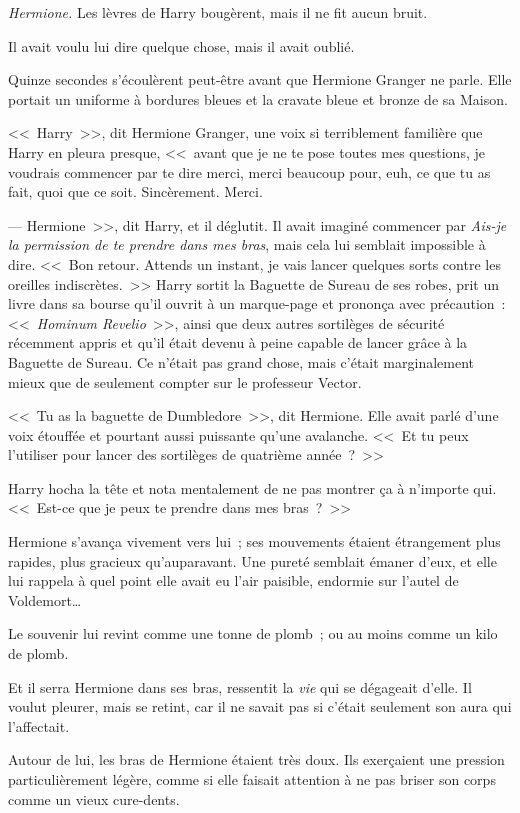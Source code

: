 \emph{Hermione.} Les lèvres de Harry bougèrent, mais il ne fit aucun bruit.

Il avait voulu lui dire quelque chose, mais il avait oublié.

Quinze secondes s'écoulèrent peut-être avant que Hermione Granger ne parle. Elle portait un uniforme à bordures bleues et la cravate bleue et bronze de sa Maison.

<<~Harry~>>, dit Hermione Granger, une voix si terriblement familière que Harry en pleura presque, <<~avant que je ne te pose toutes mes questions, je voudrais commencer par te dire merci, merci beaucoup pour, euh, ce que tu as fait, quoi que ce soit. Sincèrement. Merci.

--- Hermione~>>, dit Harry, et il déglutit. Il avait imaginé commencer par \emph{Ais-je la permission de te prendre dans mes bras}, mais cela lui semblait impossible à dire. <<~Bon retour. Attends un instant, je vais lancer quelques sorts contre les oreilles indiscrètes.~>> Harry sortit la Baguette de Sureau de ses robes, prit un livre dans sa bourse qu'il ouvrit à un marque-page et prononça avec précaution~: <<~\emph{Hominum Revelio}~>>, ainsi que deux autres sortilèges de sécurité récemment appris et qu'il était devenu à peine capable de lancer grâce à la Baguette de Sureau. Ce n'était pas grand chose, mais c'était marginalement mieux que de seulement compter sur le professeur Vector.

<<~Tu as la baguette de Dumbledore~>>, dit Hermione. Elle avait parlé d'une voix étouffée et pourtant aussi puissante qu'une avalanche. <<~Et tu peux l'utiliser pour lancer des sortilèges de quatrième année~?~>>

Harry hocha la tête et nota mentalement de ne pas montrer ça à n'importe qui. <<~Est-ce que je peux te prendre dans mes bras~?~>>

Hermione s'avança vivement vers lui~; ses mouvements étaient étrangement plus rapides, plus gracieux qu'auparavant. Une pureté semblait émaner d'eux, et elle lui rappela à quel point elle avait eu l'air paisible, endormie sur l'autel de Voldemort…

Le souvenir lui revint comme une tonne de plomb~; ou au moins comme un kilo de plomb.

Et il serra Hermione dans ses bras, ressentit la \emph{vie} qui se dégageait d'elle. Il voulut pleurer, mais se retint, car il ne savait pas si c'était seulement son aura qui l'affectait.

Autour de lui, les bras de Hermione étaient très doux. Ils exerçaient une pression particulièrement légère, comme si elle faisait attention à ne pas briser son corps comme un vieux cure-dents.

